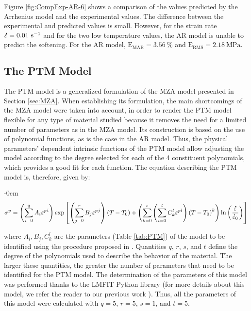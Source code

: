 \documentclass[metals,article,accept,pdftex,moreauthors]{Definitions/mdpi}
\DeclareRobustCommand{\mdot}[1]{\accentset{\mbox{\bfseries .}}{#1}}
\DeclareRobustCommand{\RMSE}{\text{E}_\text{RMS}}
\DeclareRobustCommand{\MARE}{\text{E}_\text{MAR}}
\DeclareRobustCommand{\ps}{\text{s}^{-1}}
\DeclareRobustCommand{\MPa}{\text{MPa}}
\begin{document}
Figure \ref{fig:CompExp-AR-6} shows a comparison of the values predicted by the Arrhenius model and the experimental values.
The difference between the experimental and predicted values is small.
However, for the strain rate $\mdot\varepsilon = 0.01~\ps$ and for the two low temperature values, the AR model is unable to predict the softening.
For the AR model, $\MARE=3.56~\%$ and $\RMSE=2.18~\MPa$.


\subsection{The PTM Model\label{sec:PTM}}

The PTM model \cite{TizeMha-2022} is a generalized formulation of the MZA model presented in Section \ref{sec:MZA}.
When establishing its formulation, the main shortcomings of the MZA model were taken into account, in order to render the PTM model flexible for any type of material studied because it removes the need for a limited number of parameters as in the MZA model.
Its construction is based on the use of polynomial functions, as is the case in the AR model.
Thus, the physical parameters' dependent intrinsic functions of the PTM model allow adjusting the model according to the degree selected for each of the 4 constituent polynomials, which provides a good fit for each function.
The equation describing the PTM model is, therefore, given by:

\begin{adjustwidth}{-\extralength}{0cm}
\begin{equation}
\label{eq:PTM-model}
\sigma^y = \left(\sum_{i=0}^{q}{A_i{\varepsilon^p}^{i}}\right) \exp\left[\left(\sum_{j=0}^{r}{B_j{\varepsilon^p}^{j}}\right)\left(T-T_0\right) + \left(\sum_{k=0}^{s}\left(\sum_{l=0}^{t}{C_k^l{\varepsilon^p}^{l}} \right)\left(T-T_0\right)^k \right)\ln\left( \frac{\mdot\varepsilon}{\mdot{\varepsilon}_0}\right)\right]
\end{equation}
\end{adjustwidth}
\vspace{6pt}
where $A_i, B_j, C_k^l$ are the parameters (Table \ref{tab:PTM}) of the model to be identified using the procedure proposed in \cite{TizeMha-2022}.
Quantities $q$, $r$, $s$, and $t$ define the degree of the polynomials used to describe the behavior of the material.
The larger these quantities, the greater the number of parameters that need to be identified for the PTM model.
The determination of the parameters of this model was performed thanks to the LMFIT Python library \cite{Newville-2016} (for more details about this model, we refer the reader to our previous work \cite{TizeMha-2022}).
Thus, all the parameters of this model were calculated with $q=5$, $r=5$, $s=1$, and $t=5$.
\end{document}
